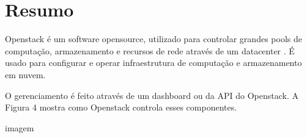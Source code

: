 \chapter[Resumo]{Resumo}\label{cap1}

Openstack é um software opensource, utilizado para  controlar grandes pools de computação, armazenamento e recursos de rede através de um datacenter \cite{ref3}. É usado para configurar e operar infraestrutura de computação e armazenamento em nuvem.

O gerenciamento é feito através de um dashboard ou da API do Openstack. A Figura 4 mostra como Openstack controla esses componentes.



imagem

